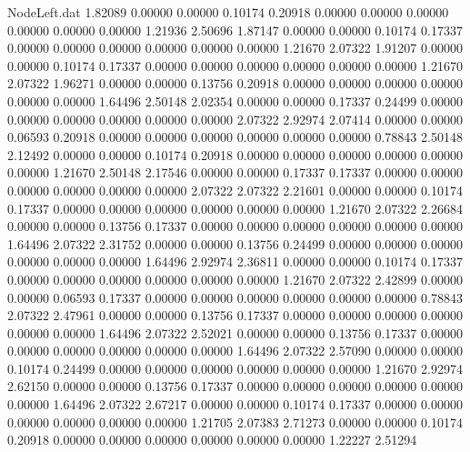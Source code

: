 \begin{filecontents}{NodeLeft.dat}
   1.82089    0.00000    0.00000     0.10174    0.20918    0.00000    0.00000    0.00000    0.00000    0.00000    0.00000    1.21936    2.50696
   1.87147    0.00000    0.00000     0.10174    0.17337    0.00000    0.00000    0.00000    0.00000    0.00000    0.00000    1.21670    2.07322
   1.91207    0.00000    0.00000     0.10174    0.17337    0.00000    0.00000    0.00000    0.00000    0.00000    0.00000    1.21670    2.07322
   1.96271    0.00000    0.00000     0.13756    0.20918    0.00000    0.00000    0.00000    0.00000    0.00000    0.00000    1.64496    2.50148
   2.02354    0.00000    0.00000     0.17337    0.24499    0.00000    0.00000    0.00000    0.00000    0.00000    0.00000    2.07322    2.92974
   2.07414    0.00000    0.00000     0.06593    0.20918    0.00000    0.00000    0.00000    0.00000    0.00000    0.00000    0.78843    2.50148
   2.12492    0.00000    0.00000     0.10174    0.20918    0.00000    0.00000    0.00000    0.00000    0.00000    0.00000    1.21670    2.50148
   2.17546    0.00000    0.00000     0.17337    0.17337    0.00000    0.00000    0.00000    0.00000    0.00000    0.00000    2.07322    2.07322
   2.21601    0.00000    0.00000     0.10174    0.17337    0.00000    0.00000    0.00000    0.00000    0.00000    0.00000    1.21670    2.07322
   2.26684    0.00000    0.00000     0.13756    0.17337    0.00000    0.00000    0.00000    0.00000    0.00000    0.00000    1.64496    2.07322
   2.31752    0.00000    0.00000     0.13756    0.24499    0.00000    0.00000    0.00000    0.00000    0.00000    0.00000    1.64496    2.92974
   2.36811    0.00000    0.00000     0.10174    0.17337    0.00000    0.00000    0.00000    0.00000    0.00000    0.00000    1.21670    2.07322
   2.42899    0.00000    0.00000     0.06593    0.17337    0.00000    0.00000    0.00000    0.00000    0.00000    0.00000    0.78843    2.07322
   2.47961    0.00000    0.00000     0.13756    0.17337    0.00000    0.00000    0.00000    0.00000    0.00000    0.00000    1.64496    2.07322
   2.52021    0.00000    0.00000     0.13756    0.17337    0.00000    0.00000    0.00000    0.00000    0.00000    0.00000    1.64496    2.07322
   2.57090    0.00000    0.00000     0.10174    0.24499    0.00000    0.00000    0.00000    0.00000    0.00000    0.00000    1.21670    2.92974
   2.62150    0.00000    0.00000     0.13756    0.17337    0.00000    0.00000    0.00000    0.00000    0.00000    0.00000    1.64496    2.07322
   2.67217    0.00000    0.00000     0.10174    0.17337    0.00000    0.00000    0.00000    0.00000    0.00000    0.00000    1.21705    2.07383
   2.71273    0.00000    0.00000     0.10174    0.20918    0.00000    0.00000    0.00000    0.00000    0.00000    0.00000    1.22227    2.51294

\end{filecontents}
